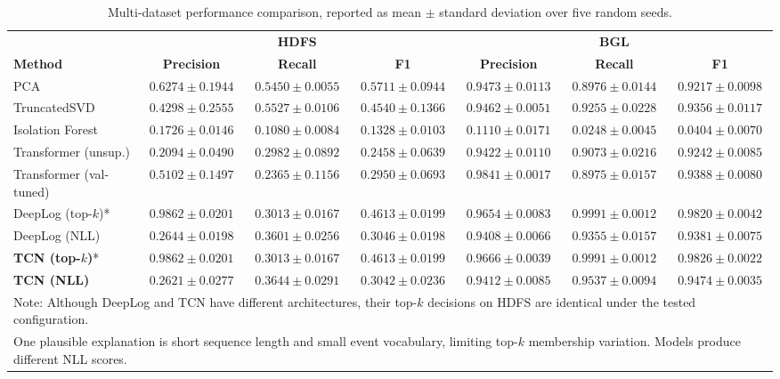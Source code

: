\documentclass[conference]{IEEEtran}
\begin{document}
\begin{table}[!t]
\caption{Multi-dataset performance comparison, reported as mean $\pm$ standard deviation over five random seeds.}
\centering
\scriptsize
\setlength{\tabcolsep}{3pt}
\begin{tabular}{l ccc ccc}
\toprule
& \multicolumn{3}{c}{\textbf{HDFS}} & \multicolumn{3}{c}{\textbf{BGL}} \\
\cmidrule(lr){2-4} \cmidrule(lr){5-7}
\textbf{Method} & \textbf{Precision} & \textbf{Recall} & \textbf{F1} & \textbf{Precision} & \textbf{Recall} & \textbf{F1} \\
\midrule
PCA & $0.6274 \pm 0.1944$ & $0.5450 \pm 0.0055$ & $0.5711 \pm 0.0944$ & $0.9473 \pm 0.0113$ & $0.8976 \pm 0.0144$ & $0.9217 \pm 0.0098$ \\
TruncatedSVD & $0.4298 \pm 0.2555$ & $0.5527 \pm 0.0106$ & $0.4540 \pm 0.1366$ & $0.9462 \pm 0.0051$ & $0.9255 \pm 0.0228$ & $0.9356 \pm 0.0117$ \\
Isolation Forest & $0.1726 \pm 0.0146$ & $0.1080 \pm 0.0084$ & $0.1328 \pm 0.0103$ & $0.1110 \pm 0.0171$ & $0.0248 \pm 0.0045$ & $0.0404 \pm 0.0070$ \\
\midrule
Transformer (unsup.) & $0.2094 \pm 0.0490$ & $0.2982 \pm 0.0892$ & $0.2458 \pm 0.0639$ & $0.9422 \pm 0.0110$ & $0.9073 \pm 0.0216$ & $0.9242 \pm 0.0085$ \\
Transformer (val-tuned) & $0.5102 \pm 0.1497$ & $0.2365 \pm 0.1156$ & $0.2950 \pm 0.0693$ & $0.9841 \pm 0.0017$ & $0.8975 \pm 0.0157$ & $0.9388 \pm 0.0080$ \\
DeepLog (top-$k$)* & $0.9862 \pm 0.0201$ & $0.3013 \pm 0.0167$ & $0.4613 \pm 0.0199$ & $0.9654 \pm 0.0083$ & $\mathbf{0.9991 \pm 0.0012}$ & $0.9820 \pm 0.0042$ \\
DeepLog (NLL) & $0.2644 \pm 0.0198$ & $0.3601 \pm 0.0256$ & $0.3046 \pm 0.0198$ & $0.9408 \pm 0.0066$ & $0.9355 \pm 0.0157$ & $0.9381 \pm 0.0075$ \\
\midrule
\textbf{TCN (top-$k$)}* & $0.9862 \pm 0.0201$ & $0.3013 \pm 0.0167$ & $0.4613 \pm 0.0199$ & $\mathbf{0.9666 \pm 0.0039}$ & $\mathbf{0.9991 \pm 0.0012}$ & $\mathbf{0.9826 \pm 0.0022}$ \\
\textbf{TCN (NLL)} & $0.2621 \pm 0.0277$ & $0.3644 \pm 0.0291$ & $0.3042 \pm 0.0236$ & $0.9412 \pm 0.0085$ & $0.9537 \pm 0.0094$ & $\mathbf{0.9474 \pm 0.0035}$ \\
\bottomrule
\multicolumn{7}{l}{\scriptsize *Note: Although DeepLog and TCN have different architectures, their top-$k$ decisions on HDFS are identical under the tested configuration.}\\
\multicolumn{7}{l}{\scriptsize One plausible explanation is short sequence length and small event vocabulary, limiting top-$k$ membership variation. Models produce different NLL scores.}
\end{tabular}
\label{tab_cross_dataset}
\end{table}
\end{document}
